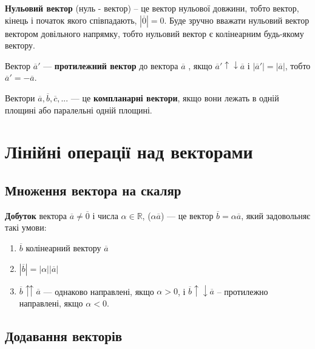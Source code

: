 \begin{definition}
	\textbf{Нульовий вектор} (нуль - вектор) – це вектор нульової довжини, тобто вектор, кінець і початок якого співпадають, $|\overline{0}| = 0$. Буде зручно вважати нульовий вектор вектором довільного напрямку, тобто нульовий вектор є колінеарним будь-якому вектору.
\end{definition}

\begin{definition}
	Вектор $\overline{a}'$ --- \textbf{протилежний вектор} до вектора $\overline{a}$ , якщо $\overline{a}' \uparrow \downarrow \overline{a}$ і $|\overline{a}'| = |\overline{a}|$, тобто $\overline{a}' = -\overline{a}$.
\end{definition}

\begin{definition}
	Вектори $\overline{a}, \overline{b}, \overline{c}, ...$ --- це \textbf{компланарні вектори}, якщо вони лежать в одній площині або паралельні одній площині.
\end{definition}

\section{Лінійні операції над векторами}

\subsection*{Множення вектора на скаляр}

\begin{definition}
	\textbf{Добуток} вектора $\overline{a} \neq \overline{0}$  і числа $\alpha \in \mathbb{R}$, ($\alpha \overline{a}$) --- це вектор $\overline{b} = \alpha \overline{a}$, який задовольняє такі умови:
		\begin{enumerate}[label=\arabic*)]
			\item $\overline{b}$ колінеарний вектору $\overline{a}$
			\item $|\overline{b}| = |\alpha| |\overline{a}|$
			\item $\overline{b} \upuparrows \overline{a}$ --- однаково направлені, якщо $\alpha > 0$, і $\overline{b} \uparrow \downarrow \overline{a}$ – протилежно направлені, якщо $\alpha < 0$.
		\end{enumerate}
\end{definition}

\subsection*{Додавання векторів}

